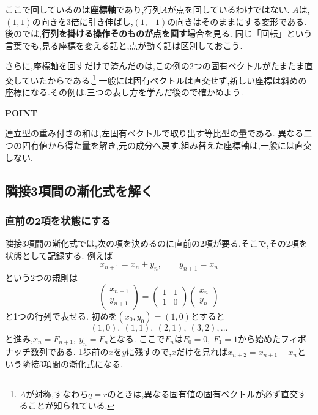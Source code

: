 ここで回しているのは\textbf{座標軸}であり,行列$A$が点を回しているわけではない.
$A$は,$(1,1)$の向きを3倍に引き伸ばし,$(1,-1)$の向きはそのままにする変形である.
後のでは,\textbf{行列を掛ける操作そのものが点を回す}場合を見る.
同じ「回転」という言葉でも,見る座標を変える話と,点が動く話は区別しておこう.

\BookMathLayout{}{\clearpage}
さらに,座標軸を回すだけで済んだのは,この例の2つの固有ベクトルがたまたま直交していたからである.\footnote{$A$が対称,すなわち$q=r$のときは,異なる固有値の固有ベクトルが必ず直交することが知られている.}
一般には固有ベクトルは直交せず,新しい座標は斜めの座標になる.その例は,三つの表し方を学んだ後ので確かめよう.

\begin{bookpoint}
  \textbf{POINT}\par
  連立型の重み付きの和は,左固有ベクトルで取り出す等比型の量である.
  異なる二つの固有値から得た量を解き,元の成分へ戻す.組み替えた座標軸は,一般には直交しない.
\end{bookpoint}

\subsection{隣接3項間の漸化式を解く}\label{節：隣接3項間の漸化式を解く}

\subsubsection{直前の2項を状態にする}
隣接3項間の漸化式では,次の項を決めるのに直前の2項が要る.そこで,その2項を状態として記録する.
例えば
\[
  x_{n+1}=x_n+y_n,
  \qquad
  y_{n+1}=x_n
\]
という2つの規則は
\[
  \begin{pmatrix}x_{n+1}\\y_{n+1}\end{pmatrix}
  =
  \begin{pmatrix}1&1\\1&0\end{pmatrix}
  \begin{pmatrix}x_n\\y_n\end{pmatrix}
\]
と1つの行列で表せる.
初めを$(x_0,y_0)=(1,0)$とすると
\[
  (1,0),\ (1,1),\ (2,1),\ (3,2),\ldots
\]
と進み,$x_n=F_{n+1},\ y_n=F_n$となる.
ここで$F_n$は$F_0=0,\ F_1=1$から始めたフィボナッチ数列である.
1歩前の$x$を$y$に残すので,$x$だけを見れば$x_{n+2}=x_{n+1}+x_n$という隣接3項間の漸化式になる.

